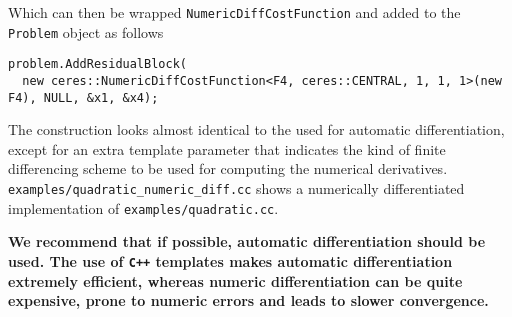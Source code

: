 Which can then be wrapped \texttt{NumericDiffCostFunction} and added to the \texttt{Problem} object as follows

\begin{verbatim}
problem.AddResidualBlock(
  new ceres::NumericDiffCostFunction<F4, ceres::CENTRAL, 1, 1, 1>(new F4), NULL, &x1, &x4);
\end{verbatim}

The construction looks almost identical to the used for automatic differentiation, except for an extra template parameter that indicates the kind of finite differencing scheme to be used for computing the numerical derivatives. \texttt{examples/quadratic\_numeric\_diff.cc} shows a numerically differentiated implementation of \texttt{examples/quadratic.cc}.

\textbf{We recommend that if possible,  automatic differentiation should be used. The use of
\texttt{C++} templates makes automatic differentiation extremely efficient,
whereas numeric differentiation can be quite expensive, prone to
numeric errors and leads to slower convergence.}